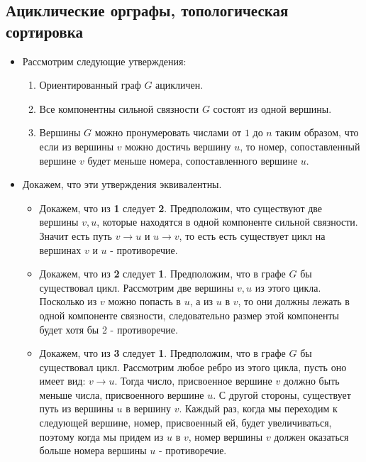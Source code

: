 \documentclass{article}
\begin{document}
    \subsection{Ациклические орграфы, топологическая сортировка}
    \begin{itemize}
        \item
        Рассмотрим следующие утверждения:
        \begin{enumerate}
            \item Ориентированный граф $G$ ацикличен. 
            \item Все компонентны сильной связности $G$ состоят из одной вершины.
            \item Вершины $G$ можно пронумеровать числами от $1$ до $n$ таким образом, что если из вершины $v$ можно достичь вершину $u$, то номер, сопоставленный вершине $v$ будет меньше номера, сопоставленного вершине $u$. 
        \end{enumerate}

        \item 
        Докажем, что эти утверждения эквивалентны.
        \begin{itemize}
        \item Докажем, что из \textbf{1} следует \textbf{2}. Предположим, что существуют две вершины $v, u$, которые находятся в одной компоненте сильной связности. Значит есть путь $v \to u$ и $u \to v$, то есть есть существует цикл на вершинах $v$ и $u$ - противоречие. 

        \item Докажем, что из \textbf{2} следует \textbf{1}. Предположим, что в графе $G$ бы существовал цикл. Рассмотрим две вершины $v, u$ из этого цикла. Посколько из $v$ можно попасть в $u$, а из $u$ в $v$, то они должны лежать в одной компоненте связности, следовательно размер этой компоненты будет хотя бы 2 - противоречие. 

        \item Докажем, что из \textbf{3} следует \textbf{1}. Предположим, что в графе $G$ бы существовал цикл. Рассмотрим любое ребро из этого цикла, пусть оно имеет вид: $v \to u$. Тогда число, присвоенное вершине $v$ должно быть меньше числа, присвоенного вершине $u$. С другой стороны, существует путь из вершины $u$ в вершину $v$. Каждый раз, когда мы переходим к следующей вершине, номер, присвоенный ей, будет увеличиваться, поэтому когда мы придем из $u$ в $v$, номер вершины $v$ должен оказаться больше номера вершины $u$ - противоречие. 


\end{itemize}
\end{itemize}
\end{document}
